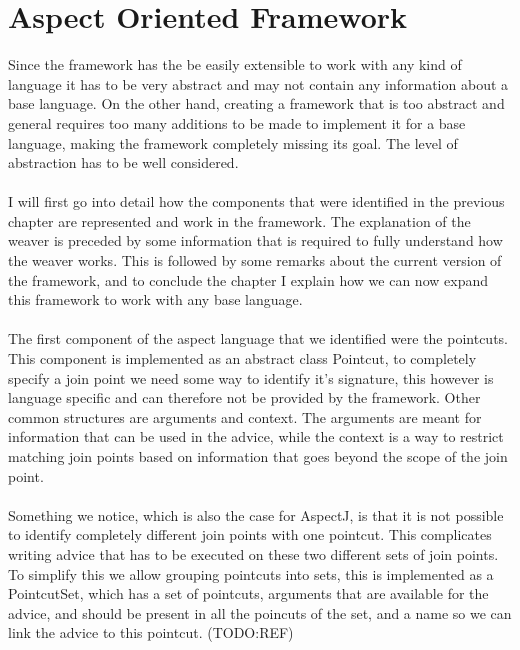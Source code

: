 \documentclass[a4paper]{report}
\begin{document}
\chapter{Aspect Oriented Framework}
Since the framework has the be easily extensible to work with any kind of language it has to be very abstract and may not contain any information about a base language. On the other hand, creating a framework that is too abstract and general requires too many additions to be made to implement it for a base language, making the framework completely missing its goal. The level of abstraction has to be well considered.\\
\\
I will first go into detail how the components that were identified in the previous chapter are represented and work in the framework. The explanation of the weaver is preceded by some information that is required to fully understand how the weaver works. This is followed by some remarks about the current version of the framework, and to conclude the chapter I explain how we can now expand this framework to work with any base language.\\
\\
The first component of the aspect language that we identified were the pointcuts. This component is implemented as an abstract class Pointcut, to completely specify a join point we need some way to identify it's signature, this however is language specific and can therefore not be provided by the framework. Other common structures are arguments and context. The arguments are meant for information that can be used in the advice, while the context is a way to restrict matching join points based on  information that goes beyond the scope of the join point.\\
\\
Something we notice, which is also the case for AspectJ, is that it is not possible to identify completely different join points with one pointcut. This complicates writing advice that has to be executed on these two different sets of join points. To simplify this we allow grouping pointcuts into sets, this is implemented as a PointcutSet, which has a set of pointcuts, arguments that are available for the advice, and should be present in all the poincuts of the set, and a name so we can link the advice to this pointcut. (TODO:REF)
\end{document}
